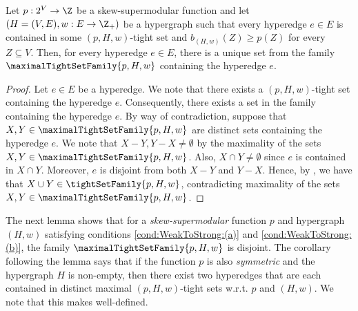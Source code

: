 \begin{corollary}\label{cor:weak-to-strong:uncrossing:maximal-tight-set-containing-hyperedge-unique}
Let $p:2^V\rightarrow\Z$ be a skew-supermodular function and let $\left(H = (V, E), w:E \rightarrow\Z_+\right)$ be a hypergraph such that  
every hyperedge $e \in E$ is contained in some $(p, H, w)$-tight set
and $b_{(H,w)}(Z) \geq p(Z)$ for every $Z \subseteq V$. 
Then, for every hyperedge $e \in E$, there is a unique set from the family $\maximalTightSetFamily{p, H, w}$ containing the hyperedge $e$.
\end{corollary}
\begin{proof}
    Let $e \in E$ be a hyperedge. We note that there exists a $(p, H, w)$-tight set containing the hyperedge $e$. Consequently, there exists a set in the family  containing the hyperedge $e$. By way of contradiction, suppose that $X, Y \in \maximalTightSetFamily{p, H, w}$ are distinct sets containing the hyperedge $e$. We note that $X - Y, Y - X \not = \emptyset$ by the maximality of the sets $X, Y \in \maximalTightSetFamily{p, H, w}$.
    Also, $X\cap Y\neq \emptyset$ since $e$ is contained in $X\cap Y$. Moreover, $e$ is disjoint from both $X-Y$ and $Y-X$. Hence, by , we have that $X\cup Y \in \tightSetFamily{p, H, w}$, contradicting maximality of the sets $X, Y \in \maximalTightSetFamily{p, H, w}$.
\end{proof}

The next lemma shows that for a \emph{skew-supermodular} function $p$ and hypergraph $(H, w)$ satisfying conditions  \ref{cond:WeakToStrong:(a)} and \ref{cond:WeakToStrong:(b)}, the family $\maximalTightSetFamily{p, H, w}$ is disjoint. The corollary following the lemma says that if the function $p$ is also \emph{symmetric} and the hypergraph $H$ is non-empty, then there exist two hyperedges that are each contained in distinct maximal $(p, H, w)$-tight sets w.r.t. $p$ and $(H, w)$.  We note that this makes   well-defined.

